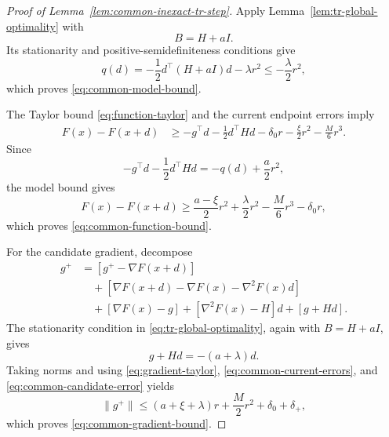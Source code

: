 \begin{proof}[Proof of Lemma~\ref{lem:common-inexact-tr-step}]
Apply Lemma~\ref{lem:tr-global-optimality} with
\[
    B=H+aI.
\]
Its stationarity and positive-semidefiniteness conditions give
\[
    q(d)
    =
    -\frac12d^\top(H+aI)d-\lambda r^2
    \le
    -\frac{\lambda}{2}r^2,
\]
which proves \eqref{eq:common-model-bound}.

The Taylor bound
\eqref{eq:function-taylor} and the current endpoint errors imply
\begin{align*}
    F(x)-F(x+d)
    &\ge
    -g^\top d
    -\frac12d^\top Hd
    -\delta_0r
    -\frac{\xi}{2}r^2
    -\frac{M}{6}r^3.
\end{align*}
Since
\[
    -g^\top d-\frac12d^\top Hd
    =
    -q(d)+\frac{a}{2}r^2,
\]
the model bound gives
\[
    F(x)-F(x+d)
    \ge
    \frac{a-\xi}{2}r^2
    +
    \frac{\lambda}{2}r^2
    -
    \frac{M}{6}r^3
    -
    \delta_0r,
\]
which proves \eqref{eq:common-function-bound}.

For the candidate gradient, decompose
\begin{align*}
    g^+
    &=
    [g^+-\nabla F(x+d)]
    \\
    &\quad+
    [\nabla F(x+d)-\nabla F(x)-\nabla^2F(x)d]
    \\
    &\quad+
    [\nabla F(x)-g]
    +
    [\nabla^2F(x)-H]d
    +
    [g+Hd].
\end{align*}
The stationarity condition in
\eqref{eq:tr-global-optimality}, again with $B=H+aI$, gives
\[
    g+Hd=-(a+\lambda)d.
\]
Taking norms and using
\eqref{eq:gradient-taylor},
\eqref{eq:common-current-errors}, and
\eqref{eq:common-candidate-error} yields
\[
    \|g^+\|
    \le
    (a+\xi+\lambda)r
    +
    \frac{M}{2}r^2
    +
    \delta_0+\delta_+,
\]
which proves \eqref{eq:common-gradient-bound}.
\end{proof}

